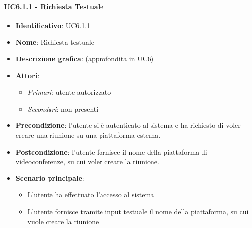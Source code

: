 \paragraph{UC6.1.1 - Richiesta Testuale}
\begin{itemize}
   \item \textbf{Identificativo}: UC6.1.1
   \item \textbf{Nome}: Richiesta testuale
   \item \textbf{Descrizione grafica}: (approfondita in UC6)
   \item \textbf{Attori}:
   \begin{itemize} 
       \item \textit{Primari}: utente autorizzato
       \item \textit{Secondari}: non presenti
   \end{itemize}
       \item \textbf{Precondizione}: l'utente si è autenticato al sistema e ha richiesto di voler creare una riunione su una piattaforma esterna.
       \item \textbf{Postcondizione}: l'utente fornisce il nome della piattaforma di videoconferenze, su cui voler creare la riunione.
    \item \textbf{Scenario principale}: 
       \begin{itemize}
           \item L'utente ha effettuato l'accesso al sistema 
           \item L'utente fornisce tramite input testuale il nome della piattaforma, su cui vuole creare la riunione
       \end{itemize}
\end{itemize}

